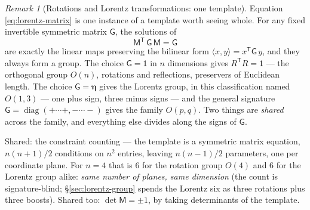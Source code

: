 \documentclass[11pt]{article}
\theoremstyle{plain}
\theoremstyle{definition}
\theoremstyle{remark}
\newtheorem{remark}[theorem]{Remark}
\begin{document}
\begin{remark}[Rotations and Lorentz transformations: one template]
\label{rem:one-template}
Equation \eqref{eq:lorentz-matrix} is one instance of a template
worth seeing whole. For any fixed invertible symmetric matrix
$\mathsf G$, the solutions of
\begin{equation}
  \mathsf M^{\mathsf T}\,\mathsf G\,\mathsf M = \mathsf G
\end{equation}
are exactly the linear maps preserving the bilinear form
$\langle x, y\rangle = x^{\mathsf T}\mathsf G\, y$, and they always
form a group. The choice $\mathsf G = \mathsf 1$ in $n$ dimensions
gives $R^{\mathsf T}R = \mathsf 1$ --- the orthogonal group $O(n)$,
rotations and reflections, preservers of Euclidean length. The choice
$\mathsf G = \boldsymbol\eta$ gives the Lorentz group, in this
classification named $O(1,3)$ --- one plus sign, three minus signs
--- and the general signature $\mathsf G =
\operatorname{diag}(+\cdots+,-\cdots-)$ gives the family $O(p,q)$.
Two things are \emph{shared} across the family, and everything else
divides along the signs of $\mathsf G$.

Shared: the constraint counting --- the template is a symmetric
matrix equation, $n(n{+}1)/2$ conditions on $n^2$ entries, leaving
$n(n{-}1)/2$ parameters, one per coordinate plane. For $n = 4$ that
is $6$ for the rotation group $O(4)$ and $6$ for the Lorentz group
alike: \emph{same number of planes, same dimension} (the count is
signature-blind; \S\ref{sec:lorentz-group} spends the Lorentz six as
three rotations plus three boosts). Shared too: $\det\mathsf M =
\pm1$, by taking determinants of the template.


\end{remark}
\end{document}
